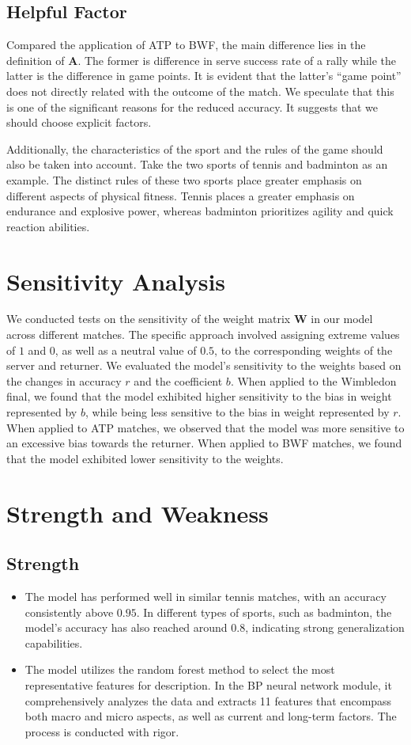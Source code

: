 \documentclass{mcmthesis}
\begin{document}
\subsection{Helpful Factor}
Compared the application of ATP to BWF, the main difference lies in the definition of $\mathbf{A}$. The former is difference in serve success rate of a rally while the latter is the difference in game points. It is evident that the latter's ``game point'' does not directly related with the outcome of the match. We speculate that this is one of the significant reasons for the reduced accuracy. It suggests that we should choose  explicit factors. 

Additionally, the characteristics of the sport and the rules of the game should also be taken into account. Take the two sports of tennis and badminton as an example. The distinct rules of these two sports place greater emphasis on different aspects of physical fitness. Tennis places a greater emphasis on endurance and explosive power, whereas badminton prioritizes agility and quick reaction abilities.
\section{Sensitivity Analysis}
We conducted tests on the sensitivity of the weight matrix $\mathbf{W}$ in our model across different matches. The specific approach involved assigning extreme values of $1$ and $0$, as well as a neutral value of $0.5$, to the corresponding weights of the server and returner. We evaluated the model's sensitivity to the weights based on the changes in accuracy $r$ and the coefficient $b$.
When applied to the Wimbledon final, we found that the model exhibited higher sensitivity to the bias in weight represented by $b$, while being less sensitive to the bias in weight represented by $r$. 
When applied to ATP matches, we observed that the model was more sensitive to an excessive bias towards the returner. 
When applied to BWF matches, we found that the model exhibited lower sensitivity to the weights.

\section{Strength and Weakness}
\subsection{Strength}
\begin{itemize}
	\item The model has performed well in similar tennis matches, with an accuracy consistently above $0.95$. In different types of sports, such as badminton, the model's accuracy has also reached around $0.8$, indicating strong generalization capabilities.
	\item The model utilizes the random forest method to select the most representative features for description. In the BP neural network module, it comprehensively analyzes the data and extracts 11 features that encompass both macro and micro aspects, as well as current and long-term factors. The process is conducted with rigor.
\end{itemize}
\end{document}
